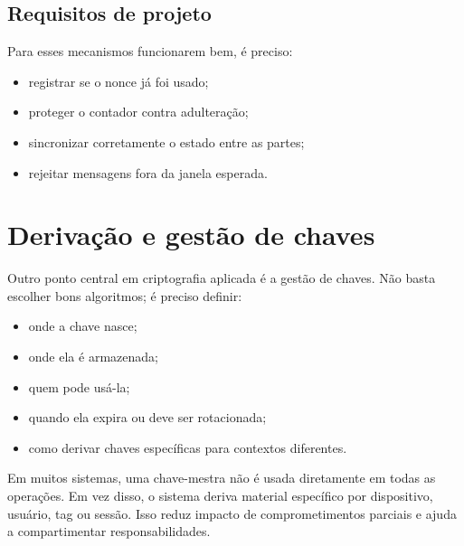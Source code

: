 \subsection{Requisitos de projeto}
Para esses mecanismos funcionarem bem, é preciso:
\begin{itemize}[leftmargin=*]
  \item registrar se o nonce já foi usado;
  \item proteger o contador contra adulteração;
  \item sincronizar corretamente o estado entre as partes;
  \item rejeitar mensagens fora da janela esperada.
\end{itemize}

\section{Derivação e gestão de chaves}
Outro ponto central em criptografia aplicada é a gestão de chaves. Não basta escolher bons algoritmos; é preciso definir:
\begin{itemize}[leftmargin=*]
  \item onde a chave nasce;
  \item onde ela é armazenada;
  \item quem pode usá-la;
  \item quando ela expira ou deve ser rotacionada;
  \item como derivar chaves específicas para contextos diferentes.
\end{itemize}

Em muitos sistemas, uma chave-mestra não é usada diretamente em todas as operações. Em vez disso, o sistema deriva material específico por dispositivo, usuário, tag ou sessão. Isso reduz impacto de comprometimentos parciais e ajuda a compartimentar responsabilidades.

